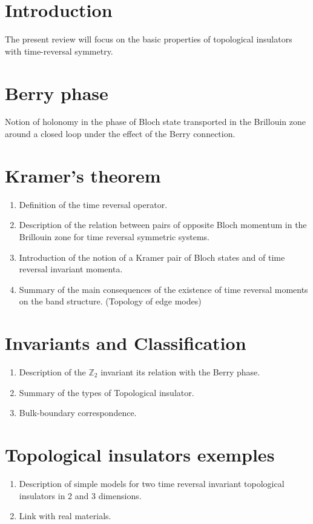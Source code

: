 {\footnotesize
\section{\label{sec:intro} Introduction}
The present review will focus on the basic properties of topological insulators with time-reversal symmetry. 


\section{\label{sec:berry_phase} Berry phase}
Notion of holonomy in the phase of Bloch state transported in the Brillouin zone around a closed loop under the effect of the Berry connection.

\section{\label{sec:kramers} Kramer's theorem}
\begin{enumerate}
    \item Definition of the time reversal operator.
    \item Description of the relation between pairs of opposite Bloch momentum in the Brillouin zone for time reversal symmetric systems.
    \item Introduction of the notion of a Kramer pair of Bloch states and of time reversal invariant momenta. 
    \item Summary of the main consequences of the existence of time reversal moments on the band structure. (Topology of edge modes)\\[0.5cm]
\end{enumerate}

\section{\label{sec:z2_invariant} Invariants and Classification}
\begin{enumerate}
    \item Description of the $\mathbb{Z}_2$ invariant its relation with the Berry phase. 
    \item Summary of the types of Topological insulator.
    \item Bulk-boundary correspondence.\\[0.5cm]
\end{enumerate}


\section{\label{sec:ti_exemples} Topological insulators exemples}
\begin{enumerate}
    \item Description of simple models for two time reversal invariant topological insulators in 2 and 3 dimensions.
    \item Link with real materials.
\end{enumerate}

}

